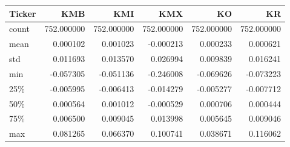 \begin{tabular}{lrrrrr}
\toprule
Ticker & KMB & KMI & KMX & KO & KR \\
\midrule
count & 752.000000 & 752.000000 & 752.000000 & 752.000000 & 752.000000 \\
mean & 0.000102 & 0.001023 & -0.000213 & 0.000233 & 0.000621 \\
std & 0.011693 & 0.013570 & 0.026994 & 0.009839 & 0.016241 \\
min & -0.057305 & -0.051136 & -0.246008 & -0.069626 & -0.073223 \\
25\% & -0.005995 & -0.006413 & -0.014279 & -0.005277 & -0.007712 \\
50\% & 0.000564 & 0.001012 & -0.000529 & 0.000706 & 0.000444 \\
75\% & 0.006500 & 0.009045 & 0.013998 & 0.005645 & 0.009046 \\
max & 0.081265 & 0.066370 & 0.100741 & 0.038671 & 0.116062 \\
\bottomrule
\end{tabular}

